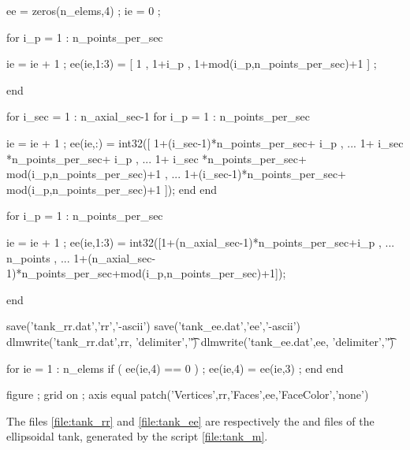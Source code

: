\begin{inputfile}[frame=single, caption={\opt{tank.m}}, label={file:tank_m}]
ee = zeros(n_elems,4) ; ie = 0 ; %

for i_p = 1 : n_points_per_sec

  ie = ie + 1 ;
  ee(ie,1:3) = [ 1 , 1+i_p , 1+mod(i_p,n_points_per_sec)+1 ] ;

end

for i_sec = 1 : n_axial_sec-1
  for i_p = 1 : n_points_per_sec

    ie = ie + 1 ;
    ee(ie,:) = int32([ 1+(i_sec-1)*n_points_per_sec+ i_p , ...
                 1+ i_sec   *n_points_per_sec+ i_p , ...
                 1+ i_sec   *n_points_per_sec+ mod(i_p,n_points_per_sec)+1 , ...
                 1+(i_sec-1)*n_points_per_sec+ mod(i_p,n_points_per_sec)+1 ]);
  end
end

for i_p = 1 : n_points_per_sec

  ie = ie + 1 ;
  ee(ie,1:3) = int32([1+(n_axial_sec-1)*n_points_per_sec+i_p , ...
                n_points , ...
                1+(n_axial_sec-1)*n_points_per_sec+mod(i_p,n_points_per_sec)+1]);
                 
end

save('tank_rr.dat','rr','-ascii')
save('tank_ee.dat','ee','-ascii')
dlmwrite('tank_rr.dat',rr, 'delimiter','\t')
dlmwrite('tank_ee.dat',ee, 'delimiter','\t')


for ie = 1 : n_elems
 if ( ee(ie,4) == 0 ) ; ee(ie,4) = ee(ie,3) ; end 
end

figure ; grid on ; axis equal
patch('Vertices',rr,'Faces',ee,'FaceColor','none')

\end{inputfile}

\noindent
The files \ref{file:tank_rr} and \ref{file:tank_ee} are respectively the  and  
files of the ellipsoidal tank, generated by the  script \ref{file:tank_m}.

